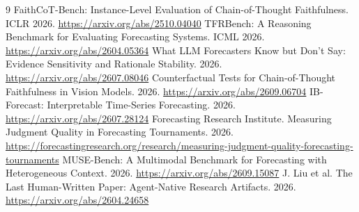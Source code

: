 \documentclass[10pt]{article}
\begin{document}
\begin{thebibliography}{9}
 FaithCoT-Bench: Instance-Level Evaluation of Chain-of-Thought Faithfulness. ICLR 2026. \url{https://arxiv.org/abs/2510.04040}
 TFRBench: A Reasoning Benchmark for Evaluating Forecasting Systems. ICML 2026. \url{https://arxiv.org/abs/2604.05364}
 What LLM Forecasters Know but Don't Say: Evidence Sensitivity and Rationale Stability. 2026. \url{https://arxiv.org/abs/2607.08046}
 Counterfactual Tests for Chain-of-Thought Faithfulness in Vision Models. 2026. \url{https://arxiv.org/abs/2609.06704}
 IB-Forecast: Interpretable Time-Series Forecasting. 2026. \url{https://arxiv.org/abs/2607.28124}
 Forecasting Research Institute. Measuring Judgment Quality in Forecasting Tournaments. 2026. \url{https://forecastingresearch.org/research/measuring-judgment-quality-forecasting-tournaments}
 MUSE-Bench: A Multimodal Benchmark for Forecasting with Heterogeneous Context. 2026. \url{https://arxiv.org/abs/2609.15087}
 J. Liu et al. The Last Human-Written Paper: Agent-Native Research Artifacts. 2026. \url{https://arxiv.org/abs/2604.24658}
\end{thebibliography}
\end{document}
